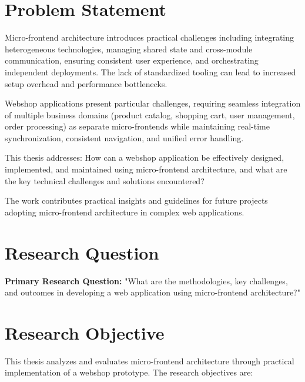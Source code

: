 \documentclass[12pt,a4paper]{report}
\begin{document}
\section{Problem Statement}
Micro-frontend architecture introduces practical challenges including integrating heterogeneous technologies, managing shared state and cross-module communication, ensuring consistent user experience, and orchestrating independent deployments. The lack of standardized tooling can lead to increased setup overhead and performance bottlenecks.

Webshop applications present particular challenges, requiring seamless integration of multiple business domains (product catalog, shopping cart, user management, order processing) as separate micro-frontends while maintaining real-time synchronization, consistent navigation, and unified error handling.

This thesis addresses: How can a webshop application be effectively designed, implemented, and maintained using micro-frontend architecture, and what are the key technical challenges and solutions encountered?

The work contributes practical insights and guidelines for future projects adopting micro-frontend architecture in complex web applications.

\section{Research Question}
\textbf{Primary Research Question:} "What are the methodologies, key challenges, and outcomes in developing a web application using micro-frontend architecture?"

\section{Research Objective}
This thesis analyzes and evaluates micro-frontend architecture through practical implementation of a webshop prototype. The research objectives are:
\end{document}
